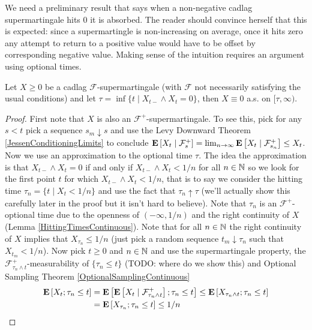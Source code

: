 We need a preliminary result that says when a non-negative cadlag supermartingale hits $0$ it is absorbed.  The reader should convince herself that this is expected: since a supermartingle is non-increasing on average, once it hits zero any attempt to return to a positive value would have to be offset by corresponding negative value.  Making sense of the intuition requires an argument using optional times.  
\begin{lem}\label{PositiveSupermartingaleAbsorption}Let $X \geq 0$ be a cadlag $\mathcal{F}$-supermartingale (with $\mathcal{F}$ not necessarily satisfying the usual conditions) and let $\tau = \inf \lbrace t \mid X_{t-} \wedge X_t =0 \rbrace$, then $X \equiv 0$ a.s. on $[\tau, \infty)$.
\end{lem}
\begin{proof}
First note that $X$ is also an $\mathcal{F}^+$-supermartingale.  To see this, pick for any $s < t$ pick a sequence $s_m \downarrow s$ and use the Levy Downward Theorem
\ref{JessenConditioningLimits}  to conclude $\cexpectationlong{\mathcal{F}_s^+}{X_t} = \lim_{n \to \infty} \cexpectationlong{\mathcal{F}_{s_n}^+}{X_t} \leq X_t$.  Now we use an approximation to the optional time $\tau$.  The idea the approximation is that $X_{t-} \wedge X_t=0$ if and only if $X_{t-} \wedge X_t < 1/n$ for all $n \in \naturals$ so we look for the first point $t$ for which $X_{t-} \wedge X_t < 1/n$, that is to say we consider the hitting time $\tau_n = \lbrace t \mid X_t < 1/n \rbrace$ and use the fact that $\tau_n \uparrow \tau$ (we'll actually show this carefully later in the proof but it isn't hard to believe).  Note that $\tau_n$ is an $\mathcal{F}^+$-optional time due to the openness of $(-\infty, 1/n)$ and the right continuity of $X$ (Lemma \ref{HittingTimesContinuous}).  Note that for all $n \in \naturals$ the right continuity of $X$ implies that $X_{\tau_n} \leq 1/n$ (just pick a random sequence $t_m \downarrow \tau_n$ such that $X_{t_m} < 1/n$).  Now pick $t \geq 0$ and $n \in \naturals$ and use the supermartingale property, the $\mathcal{F}^+_{\tau_n \wedge t}$-measurability of $\lbrace \tau_n \leq t \rbrace$ (TODO: where  do we show this) and Optional Sampling Theorem \ref{OptionalSamplingContinuous}
\begin{align*}
\expectation{ X_t ; \tau_n \leq t } &=\expectation{ \cexpectationlong{\mathcal{F}^+_{\tau_n \wedge t}}{X_t} ; \tau_n \leq t }  \leq \expectation{ X_{\tau_n \wedge t} ; \tau_n \leq t }  \\
&=\expectation{ X_{\tau_n} ; \tau_n \leq t } \leq 1/n
\end{align*}

\end{proof}
